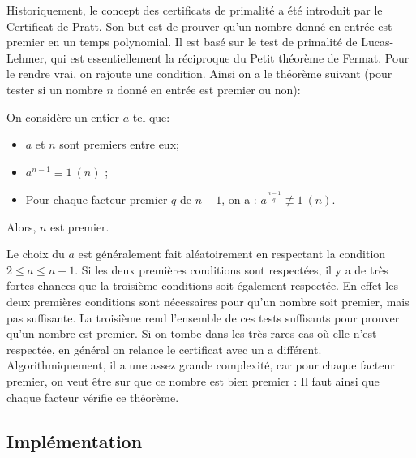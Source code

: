 \documentclass[a4paper]{article}
\begin{document}
Historiquement, le concept des certificats de primalité a été introduit
par le Certificat de Pratt. Son but est de prouver qu'un nombre donné en
entrée est premier en un temps polynomial. Il est basé sur le test de
primalité de Lucas-Lehmer, qui est essentiellement la réciproque du Petit
théorème de Fermat. Pour le rendre vrai, on rajoute une condition. Ainsi
on a le théorème suivant (pour tester si un nombre $n$ donné en entrée est
premier ou non):

\begin{theorem}
On considère un entier $a$ tel que:
\begin{itemize}
	\item	$a$ et $n$ sont premiers entre eux;
	\item	$a^{n-1} \equiv 1 \ (n)$ ;
	\item	Pour chaque facteur premier $q$ de $n-1$, on a : $a^\frac{n-1}{q} \not\equiv 1 \ (n)$.
\end{itemize}
Alors, $n$ est premier.
\end{theorem}

Le choix du $a$ est généralement fait aléatoirement en respectant la
condition $2\leq a \leq n - 1$. Si les deux premières conditions sont
respectées, il y a de très fortes chances que la troisième conditions
soit également respectée. En effet les deux premières conditions sont
nécessaires pour qu'un nombre soit premier, mais pas suffisante. La
troisième rend l'ensemble de ces tests suffisants pour prouver qu'un
nombre est premier. Si on tombe dans les très rares cas où elle n'est
respectée, en général on relance le certificat avec un a différent.
Algorithmiquement, il a une assez grande complexité, car pour chaque
facteur premier, on veut être sur que ce nombre est bien premier : Il
faut ainsi que chaque facteur vérifie ce théorème.

\subsection{Implémentation}
\end{document}
